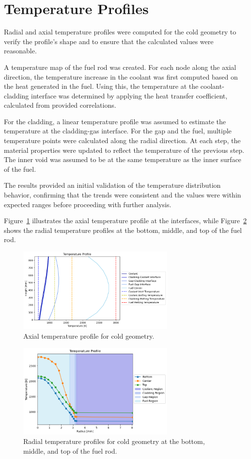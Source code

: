 \section{Temperature Profiles}
Radial and axial temperature profiles were computed for the cold geometry to verify the profile's shape and to ensure that the calculated values were reasonable.

A temperature map of the fuel rod was created. For each node along the axial direction, the temperature increase in the coolant was first computed based on the heat generated in the fuel. Using this, the temperature at the coolant-cladding interface was determined by applying the heat transfer coefficient, calculated from provided correlations.

For the cladding, a linear temperature profile was assumed to estimate the temperature at the cladding-gas interface. For the gap and the fuel, multiple temperature points were calculated along the radial direction. At each step, the material properties were updated to reflect the temperature of the previous step. The inner void was assumed to be at the same temperature as the inner surface of the fuel.

The results provided an initial validation of the temperature distribution behavior, confirming that the trends were consistent and the values were within expected ranges before proceeding with further analysis.

Figure~\ref{fig:axial_temp_profile} illustrates the axial temperature profile at the interfaces, while Figure~\ref{fig:radial_temp_profile} shows the radial temperature profiles at the bottom, middle, and top of the fuel rod.

\begin{figure}[H]
\centering
\includegraphics[width=0.7\textwidth]{axial_temp_profile_cold.png}
\caption{Axial temperature profile for cold geometry.}
\label{fig:axial_temp_profile}
\end{figure}

\begin{figure}[H]
\centering
\includegraphics[width=0.7\textwidth]{radial_temp_profile_cold.png}
\caption{Radial temperature profiles for cold geometry at the bottom, middle, and top of the fuel rod.}
\label{fig:radial_temp_profile}
\end{figure}
